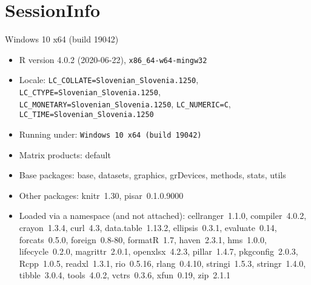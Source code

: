 \documentclass[a4paper,12pt]{article}\usepackage[]{graphicx}\usepackage[]{color}
\begin{document}
\clearpage
\section*{SessionInfo}
Windows 10 x64 (build 19042) 
\begin{itemize}\raggedright
  \item R version 4.0.2 (2020-06-22), \verb|x86_64-w64-mingw32|
  \item Locale: \verb|LC_COLLATE=Slovenian_Slovenia.1250|, \verb|LC_CTYPE=Slovenian_Slovenia.1250|, \verb|LC_MONETARY=Slovenian_Slovenia.1250|, \verb|LC_NUMERIC=C|, \verb|LC_TIME=Slovenian_Slovenia.1250|
  \item Running under: \verb|Windows 10 x64 (build 19042)|
  \item Matrix products: default
  \item Base packages: base, datasets, graphics, grDevices,
    methods, stats, utils
  \item Other packages: knitr~1.30, pisar~0.1.0.9000
  \item Loaded via a namespace (and not attached):
    cellranger~1.1.0, compiler~4.0.2, crayon~1.3.4, curl~4.3,
    data.table~1.13.2, ellipsis~0.3.1, evaluate~0.14,
    forcats~0.5.0, foreign~0.8-80, formatR~1.7, haven~2.3.1,
    hms~1.0.0, lifecycle~0.2.0, magrittr~2.0.1,
    openxlsx~4.2.3, pillar~1.4.7, pkgconfig~2.0.3, Rcpp~1.0.5,
    readxl~1.3.1, rio~0.5.16, rlang~0.4.10, stringi~1.5.3,
    stringr~1.4.0, tibble~3.0.4, tools~4.0.2, vctrs~0.3.6,
    xfun~0.19, zip~2.1.1
\end{itemize}
\end{document}
